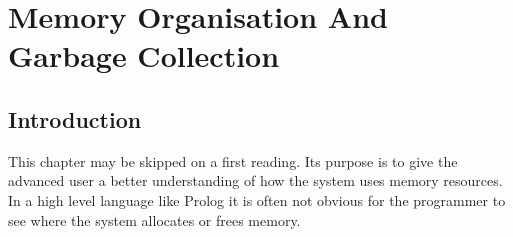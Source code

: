 %
%
%
%
%
%
%
%
%
%

\chapter{Memory Organisation And Garbage Collection\label{chapmemory}}
\section{Introduction}
This chapter may be skipped on a first reading.
Its purpose is to give the advanced user a better understanding
of how the system uses memory resources.
In a high level language like Prolog it is often not obvious for the programmer
to see where the system allocates or frees memory.

